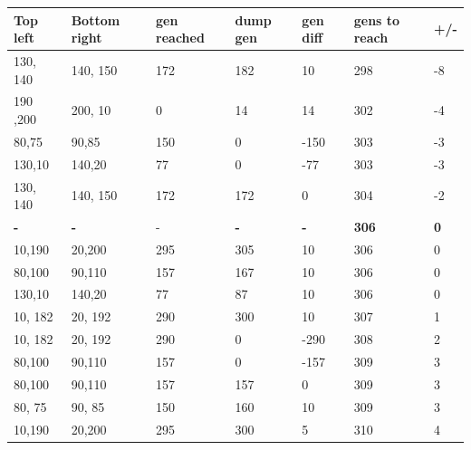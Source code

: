 \documentclass[11pt, a4paper, titlepage]{article}
\begin{document}
  \begin{table}[H]
    \begin{tabular}{|l|l|l|l|l|l|l|}
    \hline
    Top left & Bottom right & gen reached & dump gen & gen diff & gens to reach & +/- \\ \hline
    130, 140 & 140, 150     & 172                          & 182      & 10       & 298           & -8  \\ \hline
    190 ,200 & 200, 10      & 0                            & 14       & 14       & 302           & -4  \\ \hline
    80,75    & 90,85        & 150                          & 0        & -150     & 303           & -3  \\ \hline
    130,10   & 140,20       & 77                           & 0        & -77      & 303           & -3  \\ \hline
    130, 140 & 140, 150     & 172                          & 172      & 0        & 304           & -2  \\ \hline
    \textbf{-}        & \textbf{-}            &\textbf{ }-                            & \textbf{-}        & \textbf{-}        & \textbf{306}           & \textbf{0}   \\ \hline
    10,190   & 20,200       & 295                          & 305      & 10       & 306           & 0   \\ \hline
    80,100   & 90,110       & 157                          & 167      & 10       & 306           & 0   \\ \hline
    130,10   & 140,20       & 77                           & 87       & 10       & 306           & 0   \\ \hline
    10, 182  & 20, 192      & 290                          & 300      & 10       & 307           & 1   \\ \hline
    10, 182  & 20, 192      & 290                          & 0        & -290     & 308           & 2   \\ \hline
    80,100   & 90,110       & 157                          & 0        & -157     & 309           & 3   \\ \hline
    80,100   & 90,110       & 157                          & 157      & 0        & 309           & 3   \\ \hline
    80, 75   & 90, 85       & 150                          & 160      & 10       & 309           & 3   \\ \hline
    10,190   & 20,200       & 295                          & 300      & 5        & 310           & 4   \\ \hline

\end{tabular}
\end{table}
\end{document}
